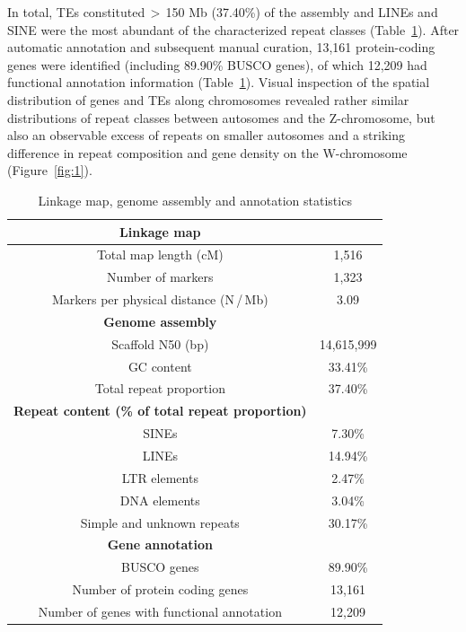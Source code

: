\documentclass[twocolumn]{bmcart}%
\begin{document}
In total, TEs constituted\,$>$\,150 Mb (37.40\%) of the assembly and LINEs and SINE were the most abundant of the characterized repeat classes (Table~\ref{tab:1}). After automatic annotation and subsequent manual curation, 13,161 protein-coding genes were identified (including 89.90\% BUSCO genes), of which 12,209 had functional annotation information (Table~\ref{tab:1}). Visual inspection of the spatial distribution of genes and TEs along chromosomes revealed rather similar distributions of repeat classes between autosomes and the Z-chromosome, but also an observable excess of repeats on smaller autosomes and a striking difference in repeat composition and gene density on the W-chromosome (Figure~\ref{fig:1}).

\begin{table}[h!]
\caption{Linkage map, genome assembly and annotation statistics}
\label{tab:1} %
  \begin{tabular}{cc}
    \hline
    \textbf{Linkage map}
     &    \\ \hline
    Total map length (cM) & 1,516 \\
    Number of markers & 1,323 \\
    Markers per physical distance (N\,/\,Mb) & 3.09  \\ \hline
      \textbf{Genome assembly}
     &    \\ \hline
   Scaffold N50 (bp) & 14,615,999 \\
   GC content & 33.41\% \\
   Total repeat proportion & 37.40\%  \\ \hline
         \textbf{Repeat content (\% of total repeat proportion)}
     &    \\ \hline
   SINEs & 7.30\% \\
   LINEs & 14.94\% \\
   LTR elements & 2.47\%  \\ 
   DNA elements & 3.04\% \\
   Simple and unknown repeats & 30.17\% \\ \hline
 \textbf{Gene annotation}  &    \\ \hline  
   BUSCO genes & 89.90\% \\
Number of protein coding genes & 13,161 \\
Number of genes with functional annotation & 12,209 \\ \hline
  \end{tabular}
\end{table}
\end{document}
